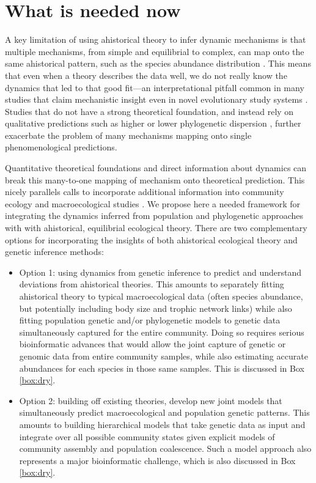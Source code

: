 \documentclass[12pt]{article}
\newcounter{Box}
\begin{document}
\section{What is needed now}

A key limitation of using ahistorical theory to infer dynamic
mechanisms is that multiple mechanisms, from simple and equilibrial to
complex, can map onto the same ahistorical pattern, such as the
species abundance distribution \citep{Kendall1948-pj, Kendall1948-ri,
  Engen1996-jt, Engen1996-na, McGill2003-sf}.  This means that even
when a theory describes the data well, we do not really know the
dynamics that led to that good fit---an interpretational pitfall
common in many studies that claim mechanistic insight even in novel
evolutionary study systems \citep{Hubbell2001-dx, Olszewski2004-ud,
  Wagner2006-te}.  Studies that do not have a strong theoretical
foundation, and instead rely on qualitative predictions such as higher
or lower phylogenetic dispersion \citep{Webb2002-yr}, further
exacerbate the problem of many mechanisms mapping onto single
phenomenological predictions.

Quantitative theoretical foundations and direct information about
dynamics can break this many-to-one mapping of mechanism onto
theoretical prediction. This nicely parallels calls to incorporate
additional information into community ecology and macroecological
studies \citep{McGill2007-zd}. We propose here a needed
framework for integrating the dynamics inferred from population and
phylogenetic approaches with with ahistorical, equilibrial ecological
theory. There are two complementary options for incorporating the
insights of both ahistorical ecological theory and genetic inference
methods:

\begin{itemize}
\item Option 1: using dynamics from genetic inference to predict and
  understand deviations from ahistorical theories. This amounts to
  separately fitting ahistorical theory to typical macroecological
  data (often species abundance, but potentially including body size
  and trophic network links) while also fitting population genetic
  and/or phylogenetic models to genetic data simultaneously captured
  for the entire community. Doing so requires serious bioinformatic
  advances that would allow the joint capture of genetic or genomic
  data from entire community samples, while also estimating accurate
  abundances for each species in those same samples. This is discussed
  in Box \ref{box:dry}.
\item Option 2: building off existing theories, develop new joint
  models that simultaneously predict macroecological and population
  genetic patterns. This amounts to building hierarchical models that
  take genetic data as input and integrate over all possible community
  states given explicit models of community assembly and population
  coalescence. Such a model approach also represents a major
  bioinformatic challenge, which is also discussed in Box
  \ref{box:dry}.
\end{itemize}
\end{document}
